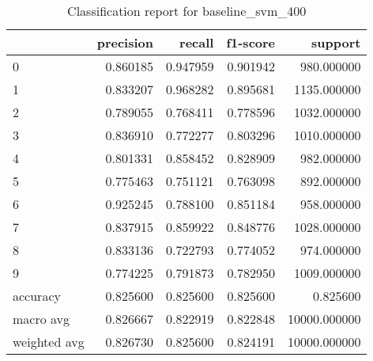 \begin{table}[htb!]
\centering
\caption{Classification report for baseline_svm_400}
\label{tab:classification-report-baseline_svm_400}
\begin{tabular}{lrrrr}
\toprule
 & precision & recall & f1-score & support \\
\midrule
0 & 0.860185 & 0.947959 & 0.901942 & 980.000000 \\
1 & 0.833207 & 0.968282 & 0.895681 & 1135.000000 \\
2 & 0.789055 & 0.768411 & 0.778596 & 1032.000000 \\
3 & 0.836910 & 0.772277 & 0.803296 & 1010.000000 \\
4 & 0.801331 & 0.858452 & 0.828909 & 982.000000 \\
5 & 0.775463 & 0.751121 & 0.763098 & 892.000000 \\
6 & 0.925245 & 0.788100 & 0.851184 & 958.000000 \\
7 & 0.837915 & 0.859922 & 0.848776 & 1028.000000 \\
8 & 0.833136 & 0.722793 & 0.774052 & 974.000000 \\
9 & 0.774225 & 0.791873 & 0.782950 & 1009.000000 \\
accuracy & 0.825600 & 0.825600 & 0.825600 & 0.825600 \\
macro avg & 0.826667 & 0.822919 & 0.822848 & 10000.000000 \\
weighted avg & 0.826730 & 0.825600 & 0.824191 & 10000.000000 \\
\bottomrule
\end{tabular}
\end{table}
